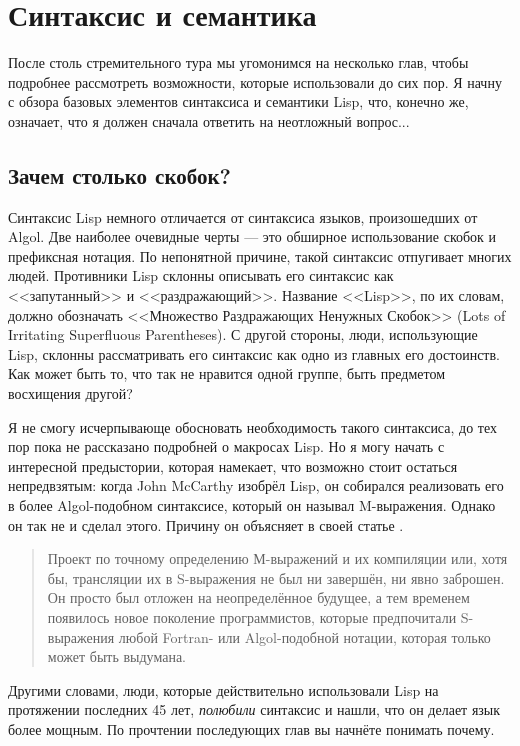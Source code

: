 \chapter{Синтаксис и семантика}
\label{ch:04}

После столь стремительного тура мы угомонимся на несколько глав, чтобы подробнее
рассмотреть возможности, которые использовали до сих пор. Я начну с обзора базовых
элементов синтаксиса и семантики Lisp, что, конечно же, означает, что я должен сначала
ответить на неотложный вопрос...

\section{Зачем столько скобок?}

Синтаксис Lisp немного отличается от синтаксиса языков, произошедших от Algol. Две
наиболее очевидные черты --- это обширное использование скобок и префиксная нотация. По
непонятной причине, такой синтаксис отпугивает многих людей. Противники Lisp склонны
описывать его синтаксис как <<запутанный>> и <<раздражающий>>. Название <<Lisp>>, по их словам,
должно обозначать <<Множество Раздражающих Ненужных Скобок>> (Lots of Irritating Superfluous
Parentheses). С другой стороны, люди, использующие Lisp, склонны рассматривать его
синтаксис как одно из главных его достоинств. Как может быть то, что так не нравится одной
группе, быть предметом восхищения другой?

Я не смогу исчерпывающе обосновать необходимость такого синтаксиса, до тех пор пока не
рассказано подробней о макросах Lisp. Но я могу начать с интересной предыстории, которая
намекает, что возможно стоит остаться непредвзятым: когда John McCarthy изобрёл Lisp, он
собирался реализовать его в более Algol-подобном синтаксисе, который он называл
M-выражения. Однако он так не и сделал этого. Причину он объясняет в своей статье
.

\begin{quote}
  Проект по точному определению М-выражений и их компиляции или, хотя бы, трансляции их в
  S-выражения не был ни завершён, ни явно заброшен. Он просто был отложен на
  неопределённое будущее, а тем временем появилось новое поколение программистов, которые
  предпочитали S-выражения любой Fortran- или Algol-подобной нотации, которая только может
  быть выдумана.
\end{quote}

Другими словами, люди, которые действительно использовали Lisp на протяжении последних 45
лет, \textit{полюбили} синтаксис и нашли, что он делает язык более мощным. По прочтении
последующих глав вы начнёте понимать почему.

